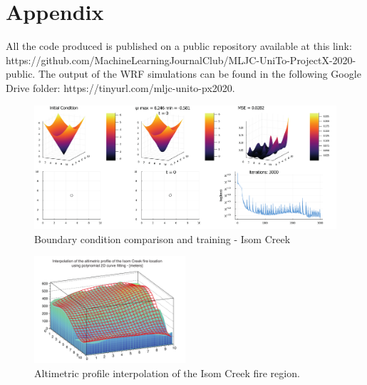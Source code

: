 \documentclass{juliacon}
\begin{document}


\clearpage

\section{Appendix}
All the code produced is published on a public repository available at this link:\\ https://github.com/MachineLearningJournalClub/MLJC-UniTo-ProjectX-2020-public.
The output of the WRF simulations can be found in the following Google Drive folder: %
https://tinyurl.com/mljc-unito-px2020.
\vspace{10pt}

\begin{figure}[h]
\includegraphics[width=1\textwidth]{images/BC_Isom.pdf}
\caption{Boundary condition comparison and training - Isom Creek}
\end{figure}

\begin{figure}[h]
\includegraphics[width=0.5\textwidth]{images/interpolation.pdf}
\caption{Altimetric profile interpolation of the Isom Creek fire region.}
\end{figure}
\end{document}
